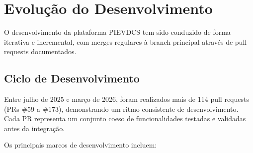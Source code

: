 \section{Evolução do Desenvolvimento}

\par O desenvolvimento da plataforma PIEVDCS tem sido conduzido de forma iterativa e incremental, com merges regulares à branch principal através de pull requests documentados. 

\subsection{Ciclo de Desenvolvimento}
\par Entre julho de 2025 e março de 2026, foram realizados mais de 114 pull requests (PRs \#59 a \#173), demonstrando um ritmo consistente de desenvolvimento. Cada PR representa um conjunto coeso de funcionalidades testadas e validadas antes da integração.

\par Os principais marcos de desenvolvimento incluem:

